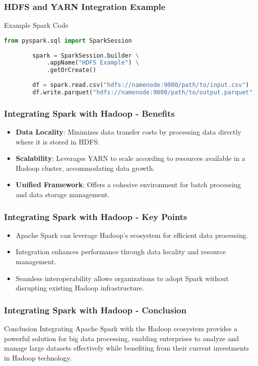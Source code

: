 \documentclass[aspectratio=169]{beamer}
\begin{document}
\begin{frame}[fragile]
    \frametitle{HDFS and YARN Integration Example}
    \begin{block}{Example Spark Code}
        \begin{lstlisting}[language=python]
        from pyspark.sql import SparkSession
        
        spark = SparkSession.builder \
            .appName("HDFS Example") \
            .getOrCreate()
        
        df = spark.read.csv("hdfs://namenode:9000/path/to/input.csv")
        df.write.parquet("hdfs://namenode:9000/path/to/output.parquet")
        \end{lstlisting}
    \end{block}
\end{frame}

\begin{frame}[fragile]
    \frametitle{Integrating Spark with Hadoop - Benefits}
    \begin{itemize}
        \item \textbf{Data Locality}: Minimizes data transfer costs by processing data directly where it is stored in HDFS.
        \item \textbf{Scalability}: Leverages YARN to scale according to resources available in a Hadoop cluster, accommodating data growth.
        \item \textbf{Unified Framework}: Offers a cohesive environment for batch processing and data storage management.
    \end{itemize}
\end{frame}

\begin{frame}[fragile]
    \frametitle{Integrating Spark with Hadoop - Key Points}
    \begin{itemize}
        \item Apache Spark can leverage Hadoop's ecosystem for efficient data processing.
        \item Integration enhances performance through data locality and resource management.
        \item Seamless interoperability allows organizations to adopt Spark without disrupting existing Hadoop infrastructure.
    \end{itemize}
\end{frame}

\begin{frame}[fragile]
    \frametitle{Integrating Spark with Hadoop - Conclusion}
    \begin{block}{Conclusion}
        Integrating Apache Spark with the Hadoop ecosystem provides a powerful solution for big data processing, enabling enterprises to analyze and manage large datasets effectively while benefiting from their current investments in Hadoop technology.
    \end{block}
\end{frame}
\end{document}
